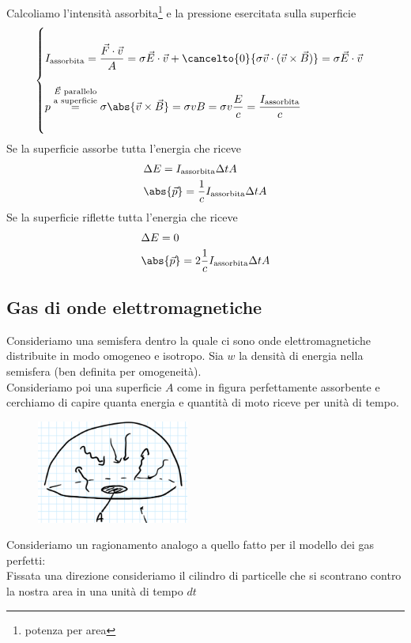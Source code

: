 \noindent
Calcoliamo l'intensit\`a assorbita\footnote{potenza per area} e la pressione esercitata sulla superficie
\[\begin{cases}
~\\
I_{\text{assorbita}}=\dfrac{\vec F\cdot \vec v}A=\sigma \vec E\cdot \vec v+\cancelto{0}{\sigma \vec v\cdot(\vec v\times \vec B)}=\sigma \vec E\cdot \vec v\\\\
p\overset{\vec E\text{ parallelo}}{\overset{\text{a superficie}}=}\sigma\abs{\vec v\times \vec B}=\sigma vB=\sigma v\dfrac Ec=\dfrac{I_{\text{assorbita}}}c\\~
\end{cases}\]
Se la superficie assorbe tutta l'energia che riceve
\begin{align*}
&\Delta E=I_{\text{assorbita}}\Delta t A\\
&\abs{\vec p}=\frac1cI_{\text{assorbita}}\Delta t A
\end{align*}
Se la superficie riflette tutta l'energia che riceve
\begin{align*}
&\Delta E=0\\
&\abs{\vec p}=2\frac1cI_{\text{assorbita}}\Delta t A
\end{align*}

\subsection{Gas di onde elettromagnetiche}
Consideriamo una semisfera dentro la quale ci sono onde elettromagnetiche distribuite in modo omogeneo e isotropo. Sia $w$ la densit\`a di energia nella semisfera (ben definita per omogeneit\`a).\\
Consideriamo poi una superficie $A$ come in figura perfettamente assorbente e cerchiamo di capire quanta energia e quantit\`a di moto riceve per unit\`a di tempo.

\begin{figure}[!htb]
    \centering
    \includegraphics[width=5cm]{images/semisfera_luce.png}
\end{figure}

\noindent
Consideriamo un ragionamento analogo a quello fatto per il modello dei gas perfetti:\\
Fissata una direzione consideriamo il cilindro di particelle che si scontrano contro la nostra area in una unit\`a di tempo $dt$


